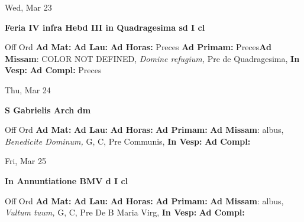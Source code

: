 \documentclass[10pt]{memoir}
\begin{document}
\begin{center}
\begin{minipage}{3.5in}
\vspace{2em}
\begin{center}Wed, Mar 23
\end{center}
\textbf{ \large Feria IV infra Hebd III in Quadragesima
\textnormal{\normalsize sd I cl}}

\begin{justify}Off Ord
\textbf{Ad Mat: }
\textbf{Ad Lau: }
\textbf{Ad Horas: }Preces
\textbf{Ad Primam: }Preces\textbf{Ad Missam}: COLOR NOT DEFINED, \textit{Domine refugium,} Pre de Quadragesima, 
\textbf{In Vesp: }
\textbf{Ad Compl: }Preces
\end{justify}
\end{minipage}
\end{center}

\begin{center}
\begin{minipage}{3.5in}
\vspace{2em}
\begin{center}Thu, Mar 24
\end{center}
\textbf{ \large S Gabrielis Arch
\textnormal{\normalsize dm}}

\begin{justify}Off Ord
\textbf{Ad Mat: }
\textbf{Ad Lau: }
\textbf{Ad Horas: }
\textbf{Ad Primam: }\textbf{Ad Missam}: albus, \textit{Benedicite Dominum,} G, C, Pre Communis, 
\textbf{In Vesp: }
\textbf{Ad Compl: }
\end{justify}
\end{minipage}
\end{center}

\begin{center}
\begin{minipage}{3.5in}
\vspace{2em}
\begin{center}Fri, Mar 25
\end{center}
\textbf{ \large In Annuntiatione BMV
\textnormal{\normalsize d I cl}}

\begin{justify}Off Ord
\textbf{Ad Mat: }
\textbf{Ad Lau: }
\textbf{Ad Horas: }
\textbf{Ad Primam: }\textbf{Ad Missam}: albus, \textit{Vultum tuum,} G, C, Pre De B Maria Virg, 
\textbf{In Vesp: }
\textbf{Ad Compl: }
\end{justify}
\end{minipage}
\end{center}
\end{document}
